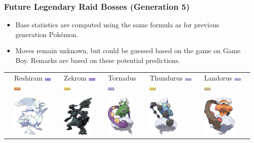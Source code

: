 \documentclass[8pt,aspectratio=169,compress]{beamer}
\newcommand{\electricfull}{\includegraphics[height=0.15cm]{../../images/type/full/Electric.png}}
\newcommand{\firefull}{\includegraphics[height=0.15cm]{../../images/type/full/Fire.png}}
\newcommand{\flyingfull}{\includegraphics[height=0.15cm]{../../images/type/full/Flying.png}}
\newcommand{\dragonfull}{\includegraphics[height=0.15cm]{../../images/type/full/Dragon.png}}
\newcommand{\groundfull}{\includegraphics[height=0.15cm]{../../images/type/full/Ground.png}}
\begin{document}
\begin{frame}
\frametitle{Future Legendary Raid Bosses (Generation 5)}

\begin{block}{}
\begin{tiny}

\begin{itemize}
\item Base statistics are computed using the same formula as for previous generation Pok\'emon.
\item Moves remain unknown, but could be guessed based on the game on Game Boy. Remarks are based on these potential predictions.
\end{itemize}

\begin{center}
\begin{tabular}{rp{2cm}p{2cm}p{2cm}p{2cm}p{2cm}}
& Reshiram \hfill \dragonfull~\firefull & Zekrom \hfill \dragonfull~\electricfull & Tornadus \hfill \flyingfull & Thundurus \hfill \flyingfull~\electricfull & Landorus  \hfill \flyingfull~\groundfull \\
& & & & \\
& \includegraphics[height=2cm]{../../images/pokemon/generation_5/Reshiram} & \includegraphics[height=2cm]{../../images/pokemon/generation_5/Zekrom} & \includegraphics[height=2cm]{../../images/pokemon/generation_5/Tornadus} & \includegraphics[height=2cm]{../../images/pokemon/generation_5/Thundurus} & \includegraphics[height=2cm]{../../images/pokemon/generation_5/Landorus} \\ \hline   

\end{tabular}
\end{center}
\end{tiny}
\end{block}
\end{frame}
\end{document}
